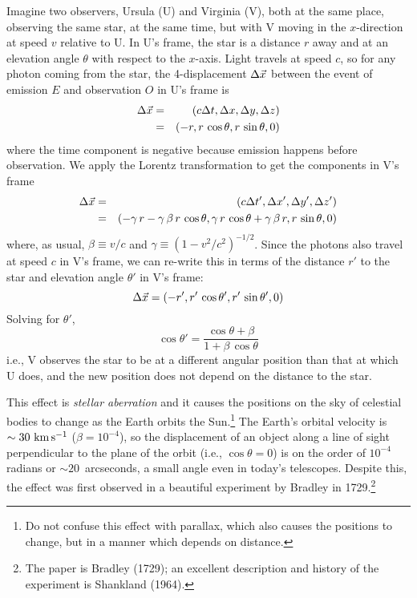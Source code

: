 Imagine two observers, Ursula (U) and Virginia (V), both at the same
place, observing the same star, at the same time, but with V moving in
the $x$-direction at speed $v$ relative to U.  In U's frame, the star
is a distance $r$ away and at an elevation angle $\theta$ with respect
to the $x$-axis.  Light travels at speed $c$, so for any photon coming
from the star, the 4-displacement $\Delta\vec{x}$ between the event of
emission $E$ and observation $O$ in U's frame is
\begin{eqnarray}
\Delta\vec{x} & = & (c\Delta t,\Delta x,\Delta y,\Delta z)\nonumber\\
& = & (-r,r\,\cos\theta ,r\,\sin\theta ,0)
\end{eqnarray}
where the time component is negative because emission happens before
observation.  We apply the Lorentz transformation to get the
components in V's frame
\begin{eqnarray}
\Delta\vec{x} & = & (c\Delta t',\Delta x',\Delta y',\Delta z')\nonumber\\
& = & (-\gamma\,r-\gamma\,\beta\,r\,\cos\theta ,
\gamma\,r\,\cos\theta+\gamma\,\beta\,r ,r\,\sin\theta ,0)\nonumber\\
\end{eqnarray}
where, as usual, $\beta\equiv v/c$ and
$\gamma\equiv(1-v^2/c^2)^{-1/2}$.  Since the photons also travel at
speed $c$ in V's frame, we can re-write this in terms of the distance
$r'$ to the star and elevation angle $\theta'$ in V's frame:
\begin{equation}
\Delta\vec{x}=(-r',r'\,\cos\theta' ,r'\,\sin\theta' ,0)
\end{equation}
Solving for $\theta'$,
\begin{equation}
\cos\theta'=\frac{\cos\theta +\beta}{1+\beta\,\cos\theta}
\end{equation}
i.e., V observes the star to be at a different angular position than
that at which U does, and the new position does not depend on the
distance to the star.

This effect is {\em stellar aberration\/} and it causes the positions
on the sky of celestial bodies to change as the Earth orbits the
Sun.\footnote{Do not confuse this effect with parallax, which also
causes the positions to change, but in a manner which depends on
distance.}  The Earth's orbital velocity is $\sim30~{\rm km\,s^{-1}}$
($\beta=10^{-4}$), so the displacement of an object along a line of
sight perpendicular to the plane of the orbit (i.e., $\cos\theta=0$)
is on the order of $10^{-4}$ radians or $\sim 20$~arcseconds, a small
angle even in today's telescopes.  Despite this, the effect was first
observed in a beautiful experiment by Bradley in 1729.\footnote{The
paper is Bradley (1729); an excellent description and history of the
experiment is Shankland (1964).}

